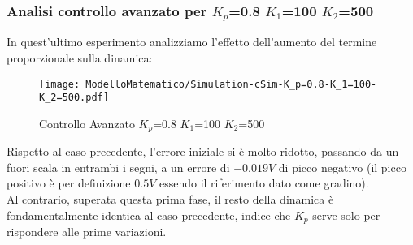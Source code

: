 \subsubsection{Analisi controllo avanzato per $ K_p $=0.8 $ K_1 $=100 $ K_2 $=500}
In quest'ultimo esperimento analizziamo l'effetto dell'aumento del termine proporzionale sulla dinamica:
\begin{figure}[H]
	\centering
	\caption[Controllo Avanzato $ K_p $=0.8 $ K_1 $=100 $ K_2 $=500]{Controllo Avanzato $ K_p $=0.8 $ K_1 $=100 $ K_2 $=500}
	\texttt{[image: ModelloMatematico/Simulation-cSim-K\_p=0.8-K\_1=100-K\_2=500.pdf]}
\end{figure}
\noindent
Rispetto al caso precedente, l'errore iniziale si è molto ridotto, passando da un fuori scala in entrambi i segni, a un errore di $ -0.019V $ di picco negativo (il picco positivo è per definizione $ 0.5V $ essendo il riferimento dato come gradino).\\
Al contrario, superata questa prima fase, il resto della dinamica è fondamentalmente identica al caso precedente, indice che $ K_p $ serve solo per rispondere alle prime variazioni.

\newpage

